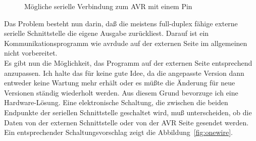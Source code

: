 \begin{figure}[H]
\centering
{}
\caption{Mögliche serielle Verbindung zum AVR mit einem Pin}
\label{fig:onewire-simple}
\end{figure}

Das Problem besteht nun darin, daß die meistens full-duplex fähige externe serielle Schnittstelle
die eigene Ausgabe zurückliest.
Darauf ist ein Kommunikationsprogramm wie avrdude auf der externen Seite im allgemeinen nicht vorbereitet.\\

Es gibt nun die Möglichkeit, das Programm auf der externen Seite entsprechend anzupassen.
Ich halte das für keine gute Idee, da die angepasste Version dann entweder keine Wartung
mehr erhält oder es müßte die Änderung für neue Versionen ständig wiederholt werden.
Aus diesem Grund bevorzuge ich eine Hardware-Lösung.
Eine elektronische Schaltung, die zwischen die beiden Endpunkte der seriellen Schnittstelle
geschaltet wird, muß unterscheiden, ob die Daten von der externen Schnittstelle oder
von der AVR Seite gesendet werden.
Ein entsprechender Schaltungsvorschlag zeigt die Abbildung~\ref{fig:onewire}.

